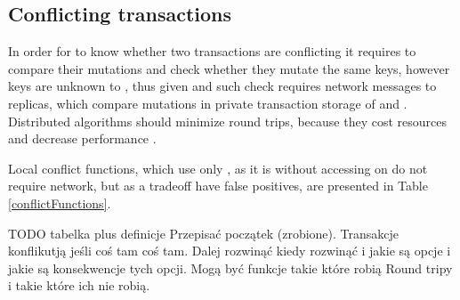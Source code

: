 
\subsection{Conflicting transactions}\label{sec:theory:conflictFunctions}
In order for  to know whether two transactions are conflicting it requires to compare their mutations and check whether they mutate the same keys, however keys are unknown to \txItems, thus
given \txStateOne and \txStateTwo such check requires network messages to replicas, which compare mutations in private transaction storage of \txStateOne and \txStateTwo. 
Distributed algorithms should minimize round trips, because they cost resources and decrease performance \cite{rotem2006fallacies}.

Local conflict functions, which use only \txState, as it is without accessing \mutations on \nodesTx do not require network, but as a tradeoff have false positives, are presented in Table \ref{conflictFunctions}. 

TODO tabelka plus definicje
Przepisać początek (zrobione). Transakcje konflikutją jeśli coś tam coś tam. Dalej rozwinąć kiedy rozwinąć i jakie są opcje i jakie są konsekwencje tych opcji. Mogą być funkcje takie które robią Round tripy i takie które ich nie robią.

